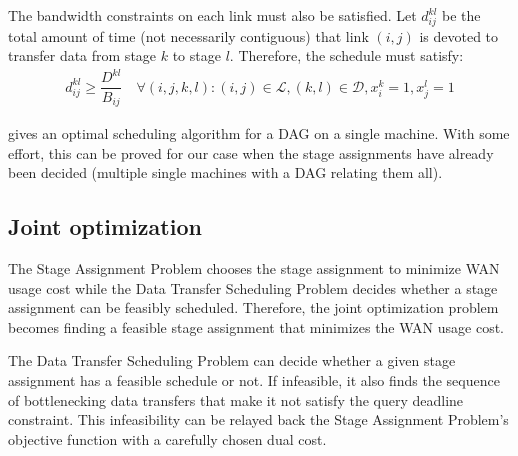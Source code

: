 The bandwidth constraints on each link must also be satisfied.
Let $d_{ij}^{kl}$ be the total amount of time (not necessarily contiguous) that link $(i,j)$ is devoted to transfer data from stage $k$ to stage $l$.
Therefore, the schedule must satisfy:
\begin{align}
	d_{ij}^{kl} \geq \dfrac{D^{kl}}{B_{ij}} \quad \forall (i,j,k,l): (i,j)\in\mathcal{L},(k,l)\in\mathcal{D},x_i^k=1,x_j^l=1
\end{align}

\begin{conjecture}
	\cite{lawler1973optimal} gives an optimal scheduling algorithm for a DAG on a single machine.
	With some effort, this can be proved for our case when the stage assignments have already been decided (multiple single machines with a DAG relating them all). 
\end{conjecture}

\subsection{Joint optimization}

The Stage Assignment Problem chooses the stage assignment to minimize WAN usage cost while the Data Transfer Scheduling Problem decides whether a stage assignment can be feasibly scheduled.
Therefore, the joint optimization problem becomes finding a feasible stage assignment that minimizes the WAN usage cost.

\begin{conjecture}
	The Data Transfer Scheduling Problem can decide whether a given stage assignment has a feasible schedule or not.
	If infeasible, it also finds the sequence of bottlenecking data transfers that make it not satisfy the query deadline constraint.
	This infeasibility can be relayed back the Stage Assignment Problem's objective function with a carefully chosen dual cost.
\end{conjecture}